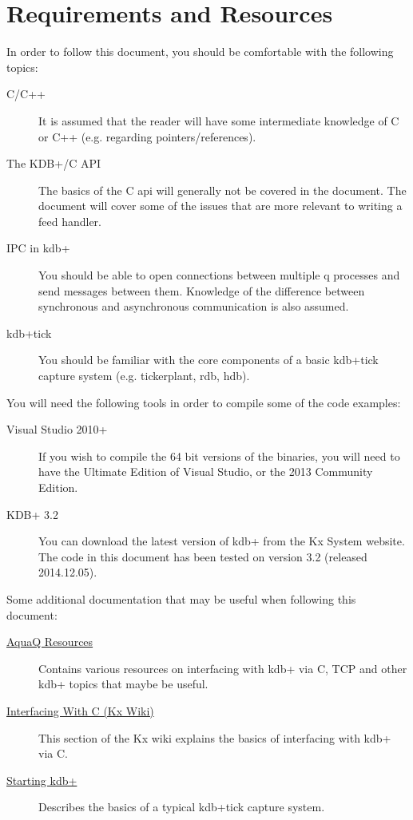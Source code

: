 \chapter{Requirements and Resources}

In order to follow this document, you should be comfortable with the following topics:

\begin{description}
	\item[C/C++] It is assumed that the reader will have some intermediate knowledge
	of C or C++ (e.g. regarding pointers/references).
	
	\item[The KDB+/C API] The basics of the C api will generally not be covered in 
	the document. The document will cover some of the issues that are more relevant
	to writing a feed handler.

	\item[IPC in kdb+] You should be able to open connections between multiple q
	processes and send messages between them. Knowledge of the difference between
	synchronous and asynchronous communication is also assumed.

	\item[kdb+tick] You should be familiar with the core components of a basic
	kdb+tick capture system (e.g. tickerplant, rdb, hdb).
\end{description}

You will need the following tools in order to compile some of the code examples:

\begin{description}
	\item[Visual Studio 2010+] If you wish to compile the 64 bit versions of the
	binaries, you will need to have the Ultimate Edition of Visual Studio, or the
	2013 Community Edition.
	
	\item[KDB+ 3.2] You can download the latest version of kdb+ from the Kx System
	website. The code in this document has been tested on version 3.2 (released 2014.12.05).
\end{description}

Some additional documentation that may be useful when following this document:

\begin{description}
	\item[\href{http://www.aquaq.co.uk/resources}{AquaQ Resources}] Contains various resources on interfacing
	with kdb+ via C, TCP and other kdb+ topics that maybe be useful.
	
	\item[\href{http://code.kx.com/wiki/Cookbook/InterfacingWithC}{Interfacing With C (Kx Wiki)}] This section
	of the Kx wiki explains the basics of interfacing with kdb+ via C.

	\item[\href{http://code.kx.com/wiki/Startingkdbplus/tick}{Starting kdb+}] Describes the basics of a typical
	kdb+tick capture system.
\end{description}